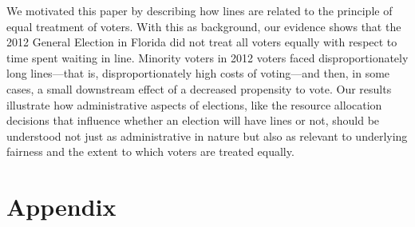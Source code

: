 \documentclass[12pt,titlepage]{article}
\begin{document}
We motivated this paper by describing how lines are related to the
principle of equal treatment of voters.  With this as background, our
evidence shows that the 2012 General Election in Florida did not treat
all voters equally with respect to time spent waiting in line.
Minority voters in 2012 voters faced disproportionately long
lines---that is, disproportionately high costs of voting---and then,
in some cases, a small downstream effect of a decreased propensity to
vote.  Our results illustrate how administrative aspects of elections,
like the resource allocation decisions that influence whether an
election will have lines or not, should be understood not just as
administrative in nature but also as relevant to underlying fairness
and the extent to which voters are treated equally.




% 

\clearpage
\newpage




\newpage
\appendix
\section*{Appendix}


\end{document}
